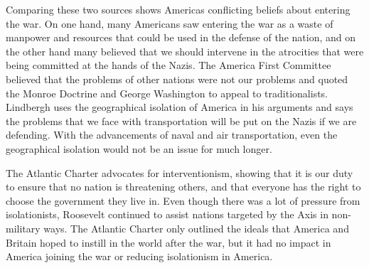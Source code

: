 Comparing these two sources shows Americas conflicting beliefs about entering the war.
On one hand, many Americans saw entering the war as a waste of manpower and resources that could be used in the defense of the nation, and on the other hand many believed that we should intervene in the atrocities that were being committed at the hands of the Nazis.
The America First Committee believed that the problems of other nations were not our problems and quoted the Monroe Doctrine and George Washington to appeal to traditionalists.
Lindbergh uses the geographical isolation of America in his arguments and says the problems that we face with transportation will be put on the Nazis if we are defending.
With the advancements of naval and air transportation, even the geographical isolation would not be an issue for much longer.

The Atlantic Charter advocates for interventionism, showing that it is our duty to ensure that no nation is threatening others, and that everyone has the right to choose the government they live in.
Even though there was a lot of pressure from isolationists, Roosevelt continued to assist nations targeted by the Axis in non-military ways.
The Atlantic Charter only outlined the ideals that America and Britain hoped to instill in the world after the war, but it had no impact in America joining the war or reducing isolationism in America.